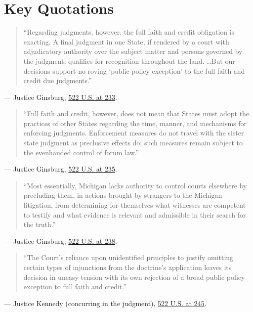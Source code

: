 \documentclass[12pt]{article}
\begin{document}
\section{Key Quotations}
\begin{quote}
``Regarding judgments, however, the full faith and credit obligation is exacting. A final judgment in one State, if rendered by a court with adjudicatory authority over the subject matter and persons governed by the judgment, qualifies for recognition throughout the land. \ldots But our decisions support no roving `public policy exception' to the full faith and credit due judgments.''
\end{quote}
\noindent --- Justice Ginsburg, \href{https://www.law.cornell.edu/supremecourt/text/96-653}{522 U.S. at 233}.

\begin{quote}
``Full faith and credit, however, does not mean that States must adopt the practices of other States regarding the time, manner, and mechanisms for enforcing judgments. Enforcement measures do not travel with the sister state judgment as preclusive effects do; such measures remain subject to the evenhanded control of forum law.''
\end{quote}
\noindent --- Justice Ginsburg, \href{https://www.law.cornell.edu/supremecourt/text/96-653}{522 U.S. at 235}.

\begin{quote}
``Most essentially, Michigan lacks authority to control courts elsewhere by precluding them, in actions brought by strangers to the Michigan litigation, from determining for themselves what witnesses are competent to testify and what evidence is relevant and admissible in their search for the truth.''
\end{quote}
\noindent --- Justice Ginsburg, \href{https://supreme.justia.com/cases/federal/us/522/222/}{522 U.S. at 238}.

\begin{quote}
``The Court's reliance upon unidentified principles to justify omitting certain types of injunctions from the doctrine's application leaves its decision in uneasy tension with its own rejection of a broad public policy exception to full faith and credit.''
\end{quote}
\noindent --- Justice Kennedy (concurring in the judgment), \href{https://www.law.cornell.edu/supct/html/96-653.ZC1.html}{522 U.S. at 245}.
\end{document}
